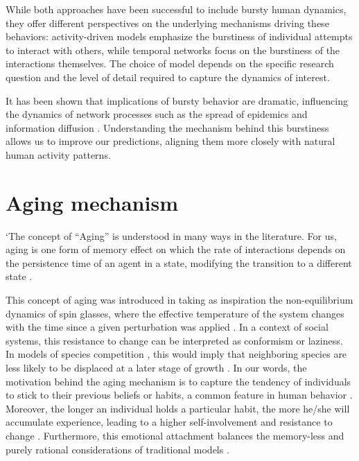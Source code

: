 While both approaches have been successful to include bursty human dynamics, they offer different perspectives on the underlying mechanisms driving these behaviors: activity-driven models emphasize the burstiness of individual attempts to interact with others, while temporal networks focus on the burstiness of the interactions themselves. The choice of model depends on the specific research question and the level of detail required to capture the dynamics of interest.

It has been shown that implications of bursty behavior are dramatic, influencing the dynamics of network processes such as the spread of epidemics and information diffusion \cite{Rocha2013Bursts, Wang2009Viruses}. Understanding the mechanism behind this burstiness allows us to improve our predictions, aligning them more closely with natural human activity patterns.

\section{\label{sec:Aging mechanism} Aging mechanism}

`The concept of ``Aging'' is understood in many ways in the literature. For us, aging is one form of memory effect \cite{jkedrzejewski2018impact} on which the rate of interactions depends on the persistence time of an agent in a state, modifying the transition to a different state \cite{fernandez-gracia-2011,perez-2016,boguna-2014}. 

This concept of aging was introduced in \cite{stark-2008} taking as inspiration the non-equilibrium dynamics of spin glasses, where the effective temperature of the system changes with the time since a given perturbation was applied \cite{cugliandolo1993analytical}. In a context of social systems, this resistance to change can be interpreted as conformism or laziness. In models of species competition \cite{ravasz2004spreading}, this would imply that neighboring species are less likely to be displaced at a later stage of growth \cite{stark-2008}. In our words, the motivation behind the aging mechanism is to capture the tendency of individuals to stick to their previous beliefs or habits, a common feature in human behavior \cite{granovetter-1973}. Moreover, the longer an individual holds a particular habit, the more he/she will accumulate experience, leading to a higher self-involvement and resistance to change \cite{lejarraga2011let}. Furthermore, this emotional attachment balances the memory-less and purely rational considerations of traditional models \cite{granovetter-1985}.

